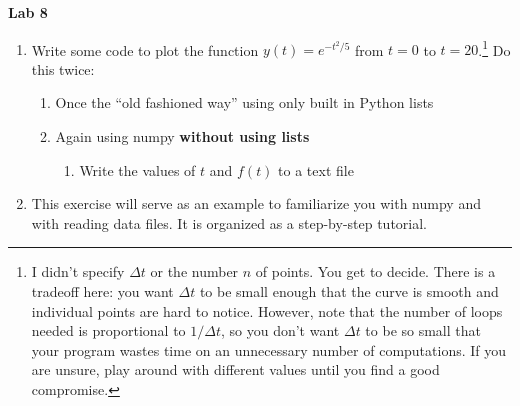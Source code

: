 \documentclass{article}
\begin{document}
\fancyfoot[C]{\thepage}
\vspace*{0cm}
\begin{center}
	{\LARGE \textbf{Lab 8}}\\
	\vspace{.25cm}
\end{center}

\begin{enumerate}
	\item Write some code to plot the function $y(t) = e^{-t^2/5}$ from $t=0$ to $t=20$.\footnote{I didn't specify $\Delta t$ or the number $n$ of points. You get to decide. There is a tradeoff here: you want $\Delta t$ to be small enough that the curve is smooth and individual points are hard to notice. However, note that the number of loops needed is proportional to $1/\Delta t$, so you don't want $\Delta t$ to be so small that your program wastes time on an unnecessary number of computations. If you are unsure, play around with different values until you find a good compromise.} Do this twice:
	\begin{enumerate}
		\item Once the ``old fashioned way'' using only built in Python lists
		\item Again using numpy \textbf{without using lists}
		\begin{enumerate}
			\item Write the values of $t$ and $f(t)$ to a text file
		\end{enumerate}
	\end{enumerate}
	\item This exercise will serve as an example to familiarize you with numpy and with reading data files. It is organized as a step-by-step tutorial.
	

\end{enumerate}
\end{document}
